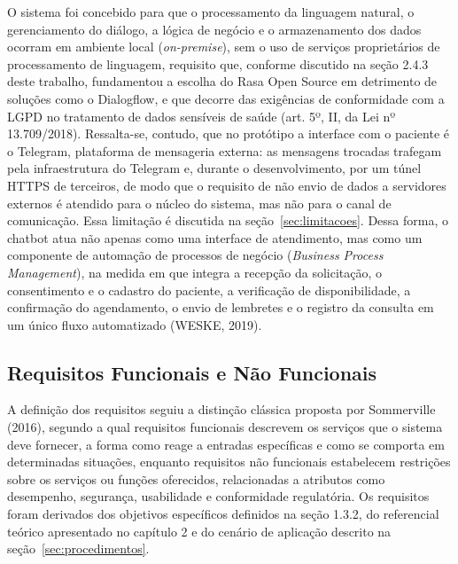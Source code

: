 \documentclass[12pt,a4paper]{extarticle}
\begin{document}
O sistema foi concebido para que o processamento da linguagem natural, o gerenciamento do diálogo, a lógica de negócio e o armazenamento dos dados ocorram em ambiente local (\textit{on-premise}), sem o uso de serviços proprietários de processamento de linguagem, requisito que, conforme discutido na seção 2.4.3 deste trabalho, fundamentou a escolha do Rasa Open Source em detrimento de soluções como o Dialogflow, e que decorre das exigências de conformidade com a LGPD no tratamento de dados sensíveis de saúde (art. 5º, II, da Lei nº 13.709/2018). Ressalta-se, contudo, que no protótipo a interface com o paciente é o Telegram, plataforma de mensageria externa: as mensagens trocadas trafegam pela infraestrutura do Telegram e, durante o desenvolvimento, por um túnel HTTPS de terceiros, de modo que o requisito de não envio de dados a servidores externos é atendido para o núcleo do sistema, mas não para o canal de comunicação. Essa limitação é discutida na seção~\ref{sec:limitacoes}. Dessa forma, o chatbot atua não apenas como uma interface de atendimento, mas como um componente de automação de processos de negócio (\textit{Business Process Management}), na medida em que integra a recepção da solicitação, o consentimento e o cadastro do paciente, a verificação de disponibilidade, a confirmação do agendamento, o envio de lembretes e o registro da consulta em um único fluxo automatizado (WESKE, 2019).

\subsection{Requisitos Funcionais e Não Funcionais}

A definição dos requisitos seguiu a distinção clássica proposta por Sommerville (2016), segundo a qual requisitos funcionais descrevem os serviços que o sistema deve fornecer, a forma como reage a entradas específicas e como se comporta em determinadas situações, enquanto requisitos não funcionais estabelecem restrições sobre os serviços ou funções oferecidos, relacionadas a atributos como desempenho, segurança, usabilidade e conformidade regulatória. Os requisitos foram derivados dos objetivos específicos definidos na seção 1.3.2, do referencial teórico apresentado no capítulo 2 e do cenário de aplicação descrito na seção~\ref{sec:procedimentos}.
\end{document}
